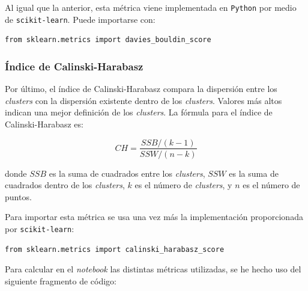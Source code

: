 \vspace{2mm}

Al igual que la anterior, esta métrica viene implementada en \texttt{Python} por medio de \texttt{scikit-learn}. Puede importarse con:

\begin{center}
    \begin{mdframed}
    \scriptsize
            \begin{verbatim}
from sklearn.metrics import davies_bouldin_score
            \end{verbatim}
    \end{mdframed}
\end{center}

\newpage

\subsubsection*{Índice de Calinski-Harabasz}

Por último, el índice de Calinski-Harabasz \cite{CalinskiHarabasz1974} compara la dispersión entre los \textit{clusters} con la dispersión existente dentro de los \textit{clusters}. Valores más altos indican una mejor definición de los \textit{clusters}. La fórmula para el índice de Calinski-Harabasz es:

\begin{equation}
    CH = \frac{SSB / (k - 1)}{SSW / (n - k)}
\end{equation}

donde \(SSB\) es la suma de cuadrados entre los \textit{clusters}, \(SSW\) es la suma de cuadrados dentro de los \textit{clusters}, \(k\) es el número de \textit{clusters}, y \(n\) es el número de puntos.

Para importar esta métrica se usa una vez más la implementación proporcionada por \texttt{scikit-learn}:

\begin{center}
    \begin{mdframed}
    \scriptsize
            \begin{verbatim}
from sklearn.metrics import calinski_harabasz_score
            \end{verbatim}
    \end{mdframed}
\end{center}

Para calcular en el \textit{notebook} las distintas métricas utilizadas, se he hecho uso del siguiente fragmento de código:

